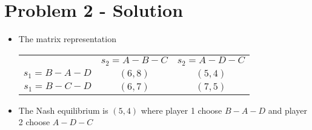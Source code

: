 \section{Problem 2 - Solution}
\begin{itemize}
        \item The matrix representation \\
        \begin{tabular}{ r|c|c| }
        \multicolumn{1}{r}{}
         &  \multicolumn{1}{c}{$s_2 = A-B-C$}
         & \multicolumn{1}{c}{$s_2 = A-D-C$} \\
        \cline{2-3}
        $s_1 = B-A-D$ & $(6,8)$ & $(5,4)$ \\
        \cline{2-3}
        $s_1 = B-C-D$ & $(6,7)$ & $(7,5)$ \\
        \cline{2-3}
        \end{tabular}
        \item The Nash equilibrium is $(5,4)$ where player 1 choose $B-A-D$ and player 2 choose $A-D-C$
\end{itemize}